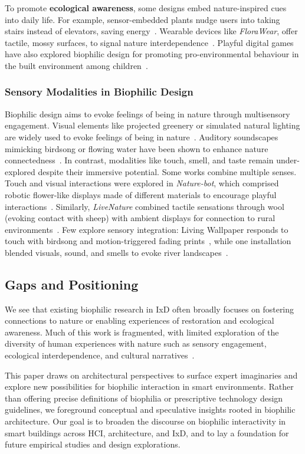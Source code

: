 To promote \textbf{ecological awareness}, some designs embed nature-inspired cues into daily life. For example, sensor-embedded plants nudge users into taking stairs instead of elevators, saving energy~\cite{loh2010please}. Wearable devices like \emph{FloraWear}, offer tactile, mossy surfaces, to signal nature interdependence~\cite{nam2023florawear}. Playful digital games have also explored biophilic design for promoting pro-environmental behaviour in the built environment among children~\cite{cumbo2020cci}.

\subsubsection{Sensory Modalities in Biophilic Design}
Biophilic design aims to evoke feelings of being in nature through multisensory engagement. Visual elements like projected greenery or simulated natural lighting are widely used to evoke feelings of being in nature~\cite{dias2024quantifying, yildirimmultisensory, aristizabal2021biophilic}. Auditory soundscapes mimicking birdsong or flowing water have been shown to enhance nature connectedness~\cite{dias2024quantifying, yildirimmultisensory, aristizabal2021biophilic}. In contrast, modalities like touch, smell, and taste remain under-explored despite their immersive potential. Some works combine multiple senses. Touch and visual interactions were explored in \emph{Nature-bot}, which comprised robotic flower-like displays made of different materials to encourage playful interactions~\cite{mcdonald2015nature, chooi2022symbiosis}. Similarly, \emph{LiveNature} combined tactile sensations through wool (evoking contact with sheep) with ambient displays for connection to rural environments~\cite{feng2019livenature}. Few explore sensory integration: Living Wallpaper responds to touch with birdsong and motion-triggered fading prints~\cite{buechley2010living}, while one installation blended visuals, sound, and smells to evoke river landscapes~\cite{werner2014river}.  

\subsection{Gaps and Positioning}
We see that existing biophilic research in IxD often broadly focuses on fostering connections to nature or enabling experiences of restoration and ecological awareness. Much of this work is fragmented, with limited exploration of the diversity of human experiences with nature such as sensory engagement, ecological interdependence, and cultural narratives~\cite{van2001new}.

This paper draws on architectural perspectives to surface expert imaginaries and explore new possibilities for biophilic interaction in smart environments. Rather than offering precise definitions of biophilia or prescriptive technology design guidelines, we foreground conceptual and speculative insights rooted in biophilic architecture. Our goal is to broaden the discourse on biophilic interactivity in smart buildings across HCI, architecture, and IxD, and to lay a foundation for future empirical studies and design explorations.


